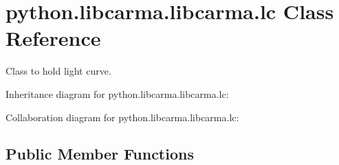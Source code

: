 \hypertarget{classpython_1_1libcarma_1_1libcarma_1_1lc}{\section{python.\-libcarma.\-libcarma.\-lc Class Reference}
\label{classpython_1_1libcarma_1_1libcarma_1_1lc}
}


Class to hold light curve.  




Inheritance diagram for python.\-libcarma.\-libcarma.\-lc\-:


Collaboration diagram for python.\-libcarma.\-libcarma.\-lc\-:
\subsection*{Public Member Functions}
